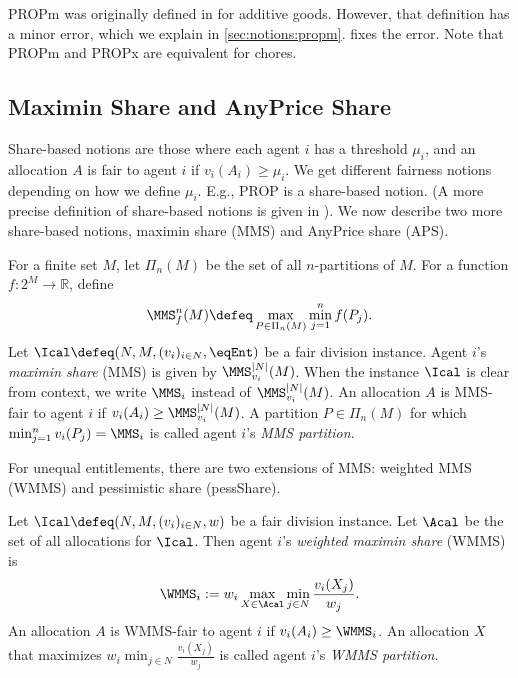 PROPm was originally defined in \cite{baklanov2021achieving} for additive goods.
However, that definition has a minor error, which we explain in \cref{sec:notions:propm}.
 fixes the error. Note that PROPm and PROPx are equivalent for chores.

\subsection{Maximin Share and AnyPrice Share}

Share-based notions are those where each agent $i$ has a threshold $\mu_i$,
and an allocation $A$ is fair to agent $i$ if $v_i(A_i) \ge \mu_i$.
We get different fairness notions depending on how we define $\mu_i$.
E.g., PROP is a share-based notion.
(A more precise definition of share-based notions is given in \cite{babaioff2022fair}).
We now describe two more share-based notions, maximin share (MMS) and AnyPrice share (APS).

\begin{definition}
\label{defn:mms}
For a finite set $M$, let $\Pi_n(M)$ be the set of all $n$-partitions of $M$.
For a function $f: 2^M \to \mathbb{R}$, define
\[ \MMS_f^n(M) \defeq \max_{P \in \Pi_n(M)} \min_{j=1}^n f(P_j). \]
%
Let $\Ical \defeq (N, M, (v_i)_{i \in N}, \eqEnt)$ be a fair division instance.
Agent $i$'s \emph{maximin share} (MMS) is given by $\MMS_{v_i}^{|N|}(M)$.
When the instance $\Ical$ is clear from context, we write $\MMS_i$ instead of $\MMS_{v_i}^{|N|}(M)$.
An allocation $A$ is MMS-fair to agent $i$ if $v_i(A_i) \ge \MMS_{v_i}^{|N|}(M)$.
A partition $P \in \Pi_n(M)$ for which $\min_{j=1}^n v_i(P_j) = \MMS_i$
is called agent $i$'s \emph{MMS partition}.
\end{definition}

For unequal entitlements, there are two extensions of MMS:
weighted MMS (WMMS) and pessimistic share (pessShare).

\begin{definition}
\label{defn:wmms}
Let $\Ical \defeq (N, M, (v_i)_{i \in N}, w)$ be a fair division instance.
Let $\Acal$ be the set of all allocations for $\Ical$.
Then agent $i$'s \emph{weighted maximin share} (WMMS) is
\[ \WMMS_i := w_i \max_{X \in \Acal} \min_{j \in N} \frac{v_i(X_j)}{w_j}. \]
An allocation $A$ is WMMS-fair to agent $i$ if $v_i(A_i) \ge \WMMS_i$.
An allocation $X$ that maximizes $w_i \min_{j \in N} \frac{v_i(X_j)}{w_j}$
is called agent $i$'s \emph{WMMS partition}.
\end{definition}

